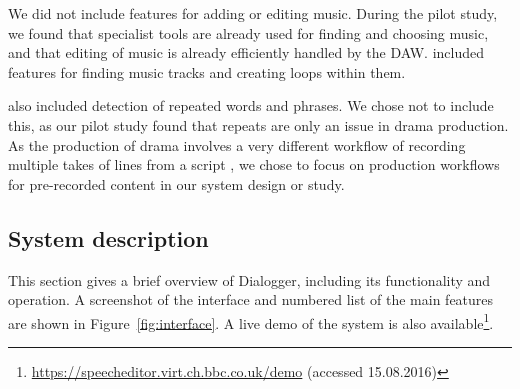 
We did not include features for adding or editing music. During the pilot study, we found that specialist tools are
already used for finding and choosing music, and that editing of music is already efficiently handled by the DAW.
\citet{Rubin2013} included features for finding music tracks and creating loops within them.

\citet{Rubin2013} also included detection of repeated words and phrases. We chose not to include this, as our pilot
study found that repeats are only an issue in drama production. As the production of drama involves a very different
workflow of recording multiple takes of lines from a script \citep{Baume2015}, we chose to focus on production
workflows for pre-recorded content in our system design or study.


\subsection{System description}

This section gives a brief overview of Dialogger, including its functionality and operation.  A screenshot of the
interface and numbered list of the main features are shown in Figure~\ref{fig:interface}.  A live demo of the system is
also available\footnote{\url{https://speecheditor.virt.ch.bbc.co.uk/demo} (accessed 15.08.2016)}.

